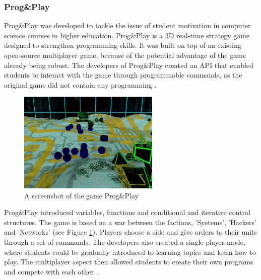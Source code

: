 \documentclass[a4paper,11.5pt]{report}
\numberwithin{figure}{section}
\numberwithin{table}{section}
\numberwithin{equation}{section}
\numberwithin{equation}{section}
\begin{document}



\subsubsection*{Prog\&Play}

Prog\&Play was developed to tackle the issue of student motivation in computer science courses in higher education. Prog\&Play is a 3D real-time strategy game designed to strengthen programming skills. It was built on top of an existing open-source multiplayer game, because of the potential advantage of the game already being robust. The developers of Prog\&Play created an API that enabled students to interact with the game through programmable commands, as the original game did not contain any programming \citep{muratet2011}.

\begin{figure}
    \includegraphics[width=0.6\textwidth]{ProgAndPlay-Example}
       \captionsetup{justification=centering}
\caption{A screenshot of the game Prog\&Play {\citep{progplaywebsite}}}
\label{fig:ProgAndPlay-Example}
\end{figure}

Prog\&Play introduced variables, functions and conditional and iterative control structures. The game is based on a war between the factions, 'Systems', 'Hackers' and 'Networks' (see Figure \ref{fig:ProgAndPlay-Example}). Players choose a side and give orders to their units through a set of commands. The developers also created a single player mode, where students could be gradually introduced to learning topics and learn how to play. The multiplayer aspect then allowed students to create their own programs and compete with each other \citep{muratet2011}.
\end{document}
